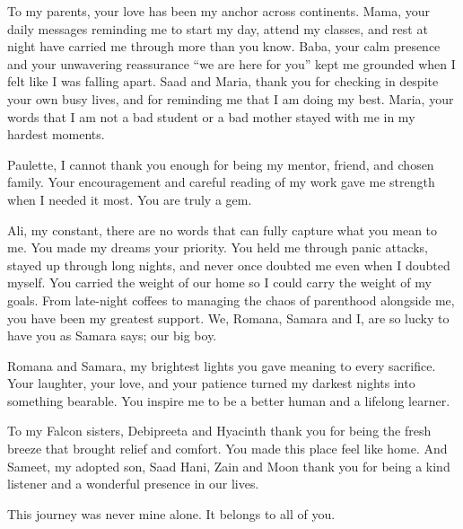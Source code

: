 To my parents, your love has been my anchor across continents. Mama, your daily messages reminding me to start my day, attend my classes, and rest at night have carried me through more than you know. Baba, your calm presence and your unwavering reassurance “we are here for you” kept me grounded when I felt like I was falling apart. Saad and Maria, thank you for checking in despite your own busy lives, and for reminding me that I am doing my best. Maria, your words that I am not a bad student or a bad mother stayed with me in my hardest moments. 

Paulette, I cannot thank you enough for being my mentor, friend, and chosen family. Your encouragement and careful reading of my work gave me strength when I needed it most. You are truly a gem. 

Ali, my constant, there are no words that can fully capture what you mean to me. You made my dreams your priority. You held me through panic attacks, stayed up through long nights, and never once doubted me even when I doubted myself. You carried the weight of our home so I could carry the weight of my goals. From late-night coffees to managing the chaos of parenthood alongside me, you have been my greatest support. We, Romana, Samara and I, are so lucky to have you as Samara says; our big boy. 

Romana and Samara, my brightest lights you gave meaning to every sacrifice. Your laughter, your love, and your patience turned my darkest nights into something bearable. You inspire me to be a better human and a lifelong learner. 

To my Falcon sisters, Debipreeta and Hyacinth thank you for being the fresh breeze that brought relief and comfort. You made this place feel like home. And Sameet, my adopted son, Saad Hani, Zain and Moon thank you for being a kind listener and a wonderful presence in our lives. 

This journey was never mine alone. It belongs to all of you. 